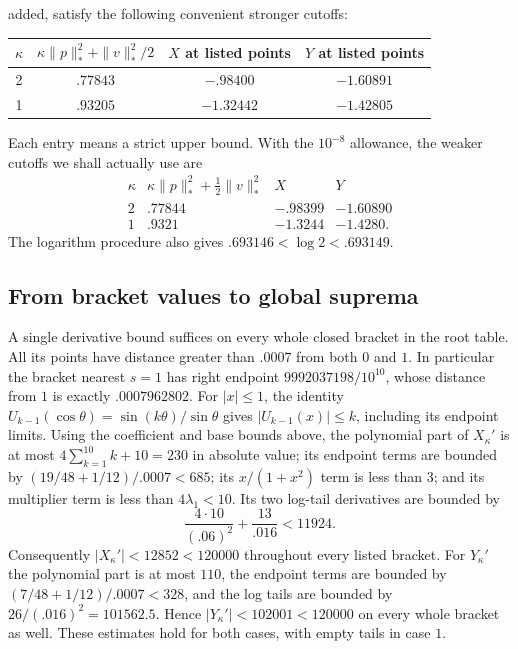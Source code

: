 added, satisfy the following convenient stronger cutoffs:
\begin{center}
\begin{tabular}{cccc}
\toprule
$\kappa$&$\kappa\|p\|_*^2+\|v\|_*^2/2$&$X$ at listed points&$Y$ at listed points\\
\midrule
2&$.77843$&$-.98400$&$-1.60891$\\
1&$.93205$&$-1.32442$&$-1.42805$\\
\bottomrule
\end{tabular}
\end{center}
Each entry means a strict upper bound.  With the $10^{-8}$ allowance,
the weaker cutoffs we shall actually use are
\begin{equation}\label{eq:certificate-coarse-cutoffs}
\begin{array}{c|ccc}
 \kappa&\kappa\|p\|_*^2+\tfrac12\|v\|_*^2&X&Y\\\hline
 2&.77844&-.98399&-1.60890\\
 1&.9321&-1.3244&-1.4280.
\end{array}
\end{equation}
The logarithm procedure also gives $.693146<\log2<.693149$.

\subsection{From bracket values to global suprema}
A single derivative bound suffices on every whole closed bracket in the
root table.  All its points have distance greater than $.0007$ from both
$0$ and $1$.  In particular the bracket nearest $s=1$ has right endpoint
$9992037198/10^{10}$, whose distance from $1$ is exactly $.0007962802$.
For $|x|\le1$, the identity
$U_{k-1}(\cos\theta)=\sin(k\theta)/\sin\theta$ gives
$|U_{k-1}(x)|\le k$, including its endpoint limits.
Using the coefficient and base bounds above, the polynomial part of
$X_\kappa'$ is at most
$4\sum_{k=1}^{10}k+10=230$ in absolute value; its endpoint terms are
bounded by $(19/48+1/12)/.0007<685$; its $x/(1+x^2)$ term is less than
$3$; and its multiplier term is less than $4\lambda_1<10$.
Its two log-tail derivatives are bounded by
\[
 \frac{4\cdot10}{(.06)^2}+\frac{13}{.016}<11924.
\]
Consequently $|X_\kappa'|<12852<120000$ throughout every listed bracket.
For $Y_\kappa'$ the polynomial part is at most $110$, the endpoint
terms are bounded by $(7/48+1/12)/.0007<328$, and the log tails are
bounded by $26/(.016)^2=101562.5$.  Hence
$|Y_\kappa'|<102001<120000$ on every whole bracket as well.
These estimates hold for both cases, with empty tails in case $1$.

